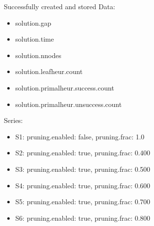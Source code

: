 \documentclass[landscape, 12pt]{report}
\begin{document}
Successfully created and stored
Data:
\begin{itemize}
\item solution.gap
\item solution.time
\item solution.nnodes
\item solution.leafheur.count
\item solution.primalheur.success.count
\item solution.primalheur.unsuccess.count
\end{itemize}
Series:
\begin{itemize}
\item S1: pruning.enabled: false, pruning.frac: 1.0
\item S2: pruning.enabled: true, pruning.frac: 0.400
\item S3: pruning.enabled: true, pruning.frac: 0.500
\item S4: pruning.enabled: true, pruning.frac: 0.600
\item S5: pruning.enabled: true, pruning.frac: 0.700
\item S6: pruning.enabled: true, pruning.frac: 0.800
\end{itemize}
\end{document}
